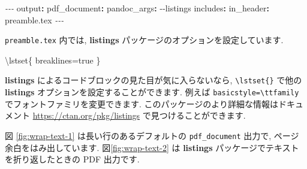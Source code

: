 \documentclass[
  11pt,
  lualatex,
  ja=standard]{bxjsreport}
\newenvironment{Shaded}{\begin{snugshade}}{\end{snugshade}}
\newcommand{\AttributeTok}[1]{\textcolor[rgb]{0.77,0.63,0.00}{#1}}
\newcommand{\FunctionTok}[1]{\textcolor[rgb]{0.00,0.00,0.00}{#1}}
\newcommand{\KeywordTok}[1]{\textcolor[rgb]{0.13,0.29,0.53}{\textbf{#1}}}
\newcommand{\NormalTok}[1]{#1}
\newcommand{\PreprocessorTok}[1]{\textcolor[rgb]{0.56,0.35,0.01}{\textit{#1}}}
\begin{document}
\begin{Shaded}
\begin{Highlighting}[]
\PreprocessorTok{{-}{-}{-}}
\FunctionTok{output}\KeywordTok{:}
\AttributeTok{  }\FunctionTok{pdf\_document}\KeywordTok{:}
\AttributeTok{    }\FunctionTok{pandoc\_args}\KeywordTok{:}\AttributeTok{ {-}{-}listings}
\AttributeTok{    }\FunctionTok{includes}\KeywordTok{:}
\AttributeTok{      }\FunctionTok{in\_header}\KeywordTok{:}\AttributeTok{ preamble.tex}
\PreprocessorTok{{-}{-}{-}}
\end{Highlighting}
\end{Shaded}

\texttt{preamble.tex} 内では, \textbf{listings} パッケージのオプションを設定しています.

\begin{Shaded}
\begin{Highlighting}[]
\FunctionTok{\textbackslash{}lstset}\NormalTok{\{}
\NormalTok{  breaklines=true}
\NormalTok{\}}
\end{Highlighting}
\end{Shaded}

\textbf{listings} によるコードブロックの見た目が気に入らないなら, \texttt{\textbackslash{}lstset\{\}} で他の \textbf{listings} オプションを設定することができます. 例えば \texttt{basicstyle=\textbackslash{}ttfamily} でフォントファミリを変更できます. このパッケージのより詳細な情報はドキュメント \url{https://ctan.org/pkg/listings} で見つけることができます.

図 \ref{fig:wrap-text-1} は長い行のあるデフォルトの \texttt{pdf\_document} 出力で, ページ余白をはみ出しています. 図\ref{fig:wrap-text-2} は \textbf{listings} パッケージでテキストを折り返したときの PDF 出力です.
\end{document}
